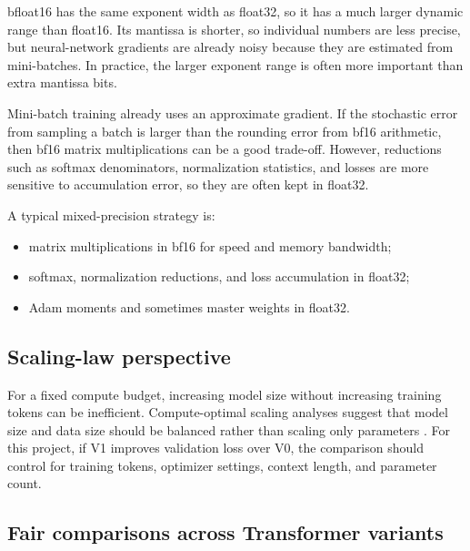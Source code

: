 \documentclass[11pt,a4paper]{article}
\theoremstyle{definition}
\theoremstyle{plain}
\begin{document}
bfloat16 has the same exponent width as float32, so it has a much larger dynamic range than float16. Its mantissa is shorter, so individual numbers are less precise, but neural-network gradients are already noisy because they are estimated from mini-batches. In practice, the larger exponent range is often more important than extra mantissa bits.

\begin{intuitionbox}
Mini-batch training already uses an approximate gradient. If the stochastic error from sampling a batch is larger than the rounding error from bf16 arithmetic, then bf16 matrix multiplications can be a good trade-off. However, reductions such as softmax denominators, normalization statistics, and losses are more sensitive to accumulation error, so they are often kept in float32.
\end{intuitionbox}

A typical mixed-precision strategy is:
\begin{itemize}[nosep]
    \item matrix multiplications in bf16 for speed and memory bandwidth;
    \item softmax, normalization reductions, and loss accumulation in float32;
    \item Adam moments and sometimes master weights in float32.
\end{itemize}

\subsection{Scaling-law perspective}

For a fixed compute budget, increasing model size without increasing training tokens can be inefficient. Compute-optimal scaling analyses suggest that model size and data size should be balanced rather than scaling only parameters \cite{hoffmann2022chinchilla}. For this project, if V1 improves validation loss over V0, the comparison should control for training tokens, optimizer settings, context length, and parameter count.

\subsection{Fair comparisons across Transformer variants}
\end{document}
